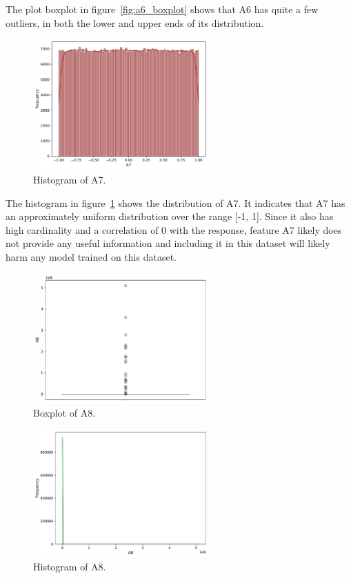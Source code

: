 \documentclass[11pt]{report}
\begin{document}
The plot boxplot in figure~\ref{fig:a6_boxplot} shows that A6 has quite a few outliers, in both the lower and upper ends of its distribution.

\begin{figure}[H]
    \centering
    \includegraphics[width=0.6\textwidth]{images/A7_histplot.pdf}
    \caption{Histogram of A7.}
    \label{fig:a7_histplot}
\end{figure}

The histogram in figure~\ref{fig:a7_histplot} shows the distribution of A7. It indicates that A7 has an approximately uniform distribution over the range [-1, 1]. Since it also has high cardinality and a correlation of 0 with the response, feature A7 likely does not provide any useful information and including it in this dataset will likely harm any model trained on this dataset.

\begin{figure}[H]
    \centering
    \includegraphics[width=0.6\textwidth]{images/A8_boxplot.pdf}
    \caption{Boxplot of A8.}
    \label{fig:a8_boxplot}
\end{figure}

\begin{figure}[H]
    \centering
    \includegraphics[width=0.6\textwidth]{images/A8_histplot.pdf}
    \caption{Histogram of A8.}
    \label{fig:a8_histplot}
\end{figure}
\end{document}
